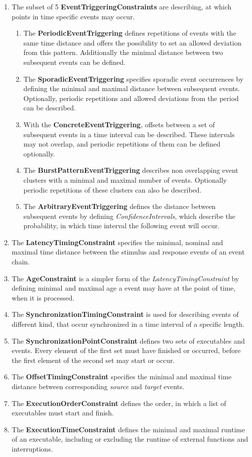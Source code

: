 	\begin{enumerate}
		\item
			The subset of 5 \textbf{EventTriggeringConstraints} are describing, at which points in time specific events may occur.
			\begin{enumerate}[1]
				\item
					The \textbf{PeriodicEventTriggering} defines repetitions of events with the same time distance and offers the possibility to set an allowed deviation from this pattern. Additionally the minimal distance between two subsequent events can be defined.
				\item
					The \textbf{SporadicEventTriggering} specifies sporadic event occurrences by defining the minimal and maximal distance between subsequent events. Optionally, periodic repetitions and allowed deviations from the period can be described.
				\item
					With the \textbf{ConcreteEventTriggering}, offsets between a set of subsequent events in a time interval can be described. These intervals may not overlap, and periodic repetitions of them can be defined optionally.
				\item
					The \textbf{BurstPatternEventTriggering} describes non overlapping event clusters with a minimal and maximal number of events. Optionally periodic repetitions of these clusters can also be described.
				\item
					The \textbf{ArbitraryEventTriggering} defines the distance between subsequent events by defining \emph{ConfidenceIntervals}, which describe the probability, in which time interval the following event will occur.
			\end{enumerate}
		\item
			The \textbf{LatencyTimingConstraint} specifies the minimal, nominal and maximal time distance between the stimulus and response events of an event chain.
		\item
			The \textbf{AgeConstraint} is a simpler form of the \emph{LatencyTimingConstraint} by defining minimal and maximal age a event may have at the point of time, when it is processed.
		\item
			The \textbf{SynchronizationTimingConstraint} is used for describing events of different kind, that occur synchronized in a time interval of a specific length.
		\item
			The \textbf{SynchronizationPointConstraint} defines two sets of executables and events. Every element of the first set must have finished or occurred, before the first element of the second set may start or occur.
		\item
			The \textbf{OffsetTimingConstraint} specifies the minimal and maximal time distance between corresponding \emph{source} and \emph{target} events.
		\item
			The \textbf{ExecutionOrderConstraint} defines the order, in which a list of executables must start and finish.
		\item
			The \textbf{ExecutionTimeConstraint} defines the minimal and maximal runtime of an executable, including or excluding the runtime of external functions and interruptions.
	\end{enumerate}

